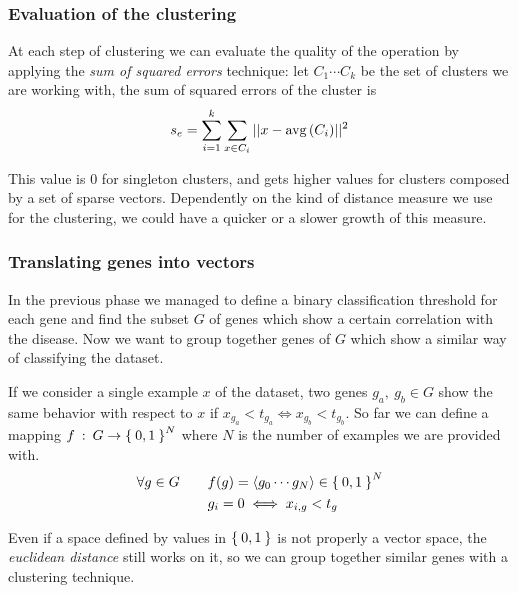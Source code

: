     \subsubsection{ Evaluation of the clustering }

        At each step of clustering we can evaluate the quality of the
        operation by applying the \emph{sum of squared errors} technique:
        let $C_1 \cdots C_k$ be the set of clusters we are working with,
        the sum of squared errors of the cluster is
        \[
        s_e = \sum_{i = 1}^k \sum_{x \in C_i} ||{x - \mbox{avg}\left({C_i}\right)}||^2
        \]

        This value is 0 for singleton clusters, and gets higher values for
        clusters composed by a set of sparse vectors. Dependently on the
        kind of distance measure we use for the clustering, we could have
        a quicker or a slower growth of this measure.

    \subsubsection{ Translating genes into vectors }

        In the previous phase we managed to define a binary classification
        threshold for each gene and find the subset $G$ of genes which
        show a certain correlation with the disease. Now we want to group
        together genes of $G$ which show a similar way of classifying the
        dataset.

        If we consider a single example $x$ of the dataset, two genes $g_a,
        \:g_b \in G$ show the same behavior with respect to $x$ if $x_{g_a}
        < t_{g_a} \iff x_{g_b} < t_{g_b}$. So far we can define a mapping
        $f \::\: G \rightarrow \Set{0, 1}^N$ where $N$ is the number of
        examples we are provided with.
        \begin{align*}
        \forall g \in G \qquad
            & f(g) = \left \langle {g_0 \cdots g_N} \right \rangle  \in \Set{0, 1}^N \\
            & g_i = 0 \iff x_{i,g} < t_g
        \end{align*}

        Even if a space defined by values in $\Set{0, 1}$ is not properly
        a vector space, the \emph{euclidean distance} still works on it,
        so we can group together similar genes with a clustering
        technique.
